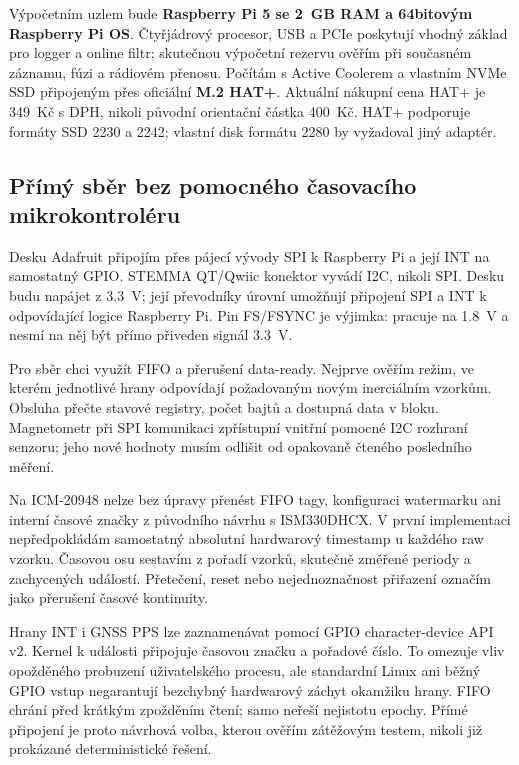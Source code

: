 Výpočetním uzlem bude \textbf{Raspberry Pi 5 se 2~GB RAM a 64bitovým
Raspberry Pi OS}. Čtyřjádrový procesor, USB a PCIe poskytují vhodný základ
pro logger a online filtr; skutečnou výpočetní rezervu ověřím při současném
záznamu, fúzi a rádiovém přenosu.\cite{raspberry-pi5}
Počítám s Active Coolerem a vlastním NVMe SSD připojeným přes oficiální
\textbf{M.2 HAT+}. Aktuální nákupní cena HAT+ je 349~Kč s DPH, nikoli původní
orientační částka 400~Kč. HAT+ podporuje formáty SSD 2230 a 2242; vlastní
disk formátu 2280 by vyžadoval jiný adaptér.\cite{rpishop-m2hat}

\subsection{Přímý sběr bez pomocného časovacího mikrokontroléru}

Desku Adafruit připojím přes pájecí vývody SPI k Raspberry Pi a její INT
na samostatný GPIO. STEMMA QT/Qwiic konektor vyvádí I2C, nikoli SPI.
Desku budu napájet z \SI{3.3}{V}; její převodníky úrovní umožňují připojení
SPI a INT k odpovídající logice Raspberry Pi. Pin FS/FSYNC je výjimka:
pracuje na \SI{1.8}{V} a nesmí na něj být přímo přiveden signál
\SI{3.3}{V}.\cite{adafruit-icm20948,adafruit-icm20948-pcb}

Pro sběr chci využít FIFO a přerušení data-ready. Nejprve ověřím režim,
ve kterém jednotlivé hrany odpovídají požadovaným novým inerciálním vzorkům.
Obsluha přečte stavové registry, počet bajtů a dostupná data v bloku.
Magnetometr při SPI komunikaci zpřístupní vnitřní pomocné I2C rozhraní
senzoru; jeho nové hodnoty musím odlišit od opakovaně čteného posledního
měření.\cite{tdk-icm20948}

Na ICM-20948 nelze bez úpravy přenést FIFO tagy, konfiguraci watermarku ani
interní časové značky z původního návrhu s ISM330DHCX. V první implementaci
nepředpokládám samostatný absolutní hardwarový timestamp u každého raw
vzorku. Časovou osu sestavím z pořadí vzorků, skutečně změřené periody a
zachycených událostí. Přetečení, reset nebo nejednoznačnost přiřazení
označím jako přerušení časové kontinuity.

Hrany INT i GNSS PPS lze zaznamenávat pomocí GPIO character-device API v2.
Kernel k události připojuje časovou značku a pořadové číslo.
\cite{linux-gpio-chardev}
To omezuje vliv opožděného probuzení uživatelského procesu, ale standardní
Linux ani běžný GPIO vstup negarantují bezchybný hardwarový záchyt okamžiku
hrany. FIFO chrání před krátkým zpožděním čtení; samo neřeší nejistotu epochy.
Přímé připojení je proto návrhová volba, kterou ověřím zátěžovým testem,
nikoli již prokázané deterministické řešení.

